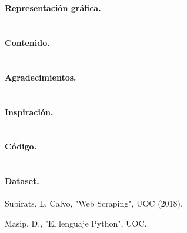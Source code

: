 \documentclass[12pt]{article}
\begin{document}
\section*{}
\paragraph{Representación gráfica.\\}


\section*{}
\paragraph{Contenido.\\}

\section*{}
\paragraph{Agradecimientos.\\}

\section*{}
\paragraph{Inspiración.\\}

\section*{}
\paragraph{Código.\\}

\section*{}
\paragraph{Dataset.\\}


\clearpage
\begin{thebibliography}{9}
	Subirats, L. Calvo, "Web Scraping", UOC (2018).
	
	Masip, D., "El lenguaje Python", UOC.

	
	
\end{thebibliography}
\end{document}
